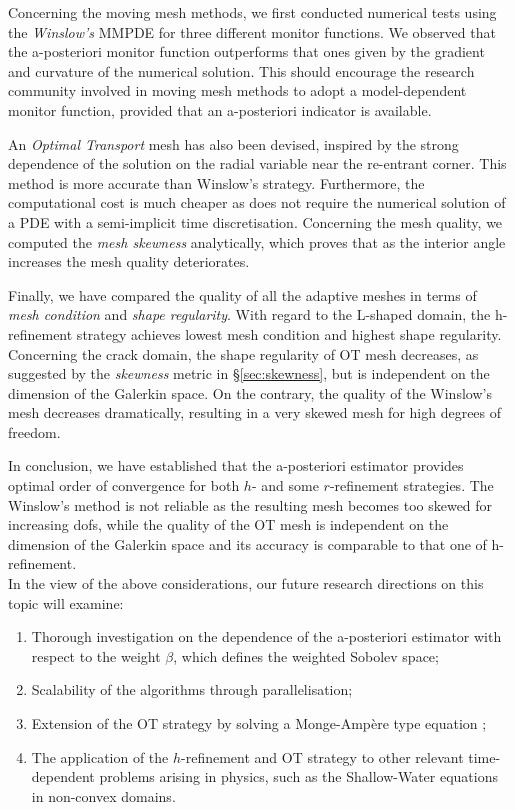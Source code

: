 \documentclass[a4paper,11pt]{article}
\begin{document}
Concerning the moving mesh methods, we first conducted numerical tests using the \textit{Winslow's} MMPDE for three different monitor functions. We observed that the a-posteriori monitor function outperforms that ones given by the gradient and curvature of the numerical solution. This should encourage the research community involved in moving mesh methods to adopt a model-dependent monitor function, provided that an a-posteriori indicator is available. 

An \textit{Optimal Transport} mesh has also been devised, inspired by the strong dependence of the solution on the radial variable near the re-entrant corner. This method is more accurate than Winslow's strategy. Furthermore, the computational cost is much cheaper as does not require the numerical solution of a PDE with a semi-implicit time discretisation. Concerning the mesh quality, we computed the \textit{mesh skewness} analytically, which proves that as the interior angle increases the mesh quality deteriorates. 


Finally, we have compared the quality of all the adaptive meshes in terms of \textit{mesh condition} and \textit{shape regularity}. With regard to the L-shaped domain, the h-refinement strategy achieves lowest mesh condition and highest shape regularity. Concerning the crack domain, the shape regularity of OT mesh decreases, as suggested by the \textit{skewness} metric in \S \ref{sec:skewness}, but is independent on the dimension of the Galerkin space. On the contrary, the quality of the Winslow's mesh decreases dramatically, resulting in a very skewed mesh for high degrees of freedom.

In conclusion, we have established that the a-posteriori estimator provides optimal order of convergence for both $h$- and some $r$-refinement strategies. The Winslow's method is not reliable as the resulting mesh becomes too skewed for increasing dofs, while the quality of the OT mesh is independent on the dimension of the Galerkin space and its accuracy is comparable to that one of h-refinement.\\

In the view of the above considerations, our future research directions on this topic will examine:

\begin{enumerate}
\item Thorough investigation on the dependence of the a-posteriori estimator with respect to the weight $\beta$, which defines the weighted Sobolev space;
\item Scalability of the algorithms through parallelisation;
\item Extension of the OT strategy by solving a Monge-Ampère type equation \cite{BRW:2015}; 
\item The application of the $h$-refinement and OT strategy to other relevant time-dependent problems arising in physics, such as the Shallow-Water equations in non-convex domains.
\end{enumerate}
\end{document}

